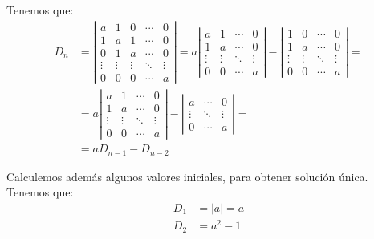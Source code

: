 \begin{ejercicio}
    Tenemos que:
    \begin{align*}
        D_n &= \left|
            \begin{array}{ccccc}
                a & 1 & 0 & \cdots & 0\\
                1 & a & 1 & \cdots & 0\\
                0 & 1 & a & \cdots & 0\\
                \vdots & \vdots & \vdots & \ddots & \vdots\\
                0 & 0 & 0 & \cdots & a
            \end{array}
        \right|
        = a\left|
            \begin{array}{cccc}
                a & 1 & \cdots & 0\\
                1 & a & \cdots & 0\\
                \vdots & \vdots & \ddots & \vdots\\
                0 & 0 & \cdots & a
            \end{array}
        \right|-\left|
            \begin{array}{cccc}
                1 & 0 & \cdots & 0\\
                1 & a & \cdots & 0\\
                \vdots & \vdots & \ddots & \vdots\\
                0 & 0 & \cdots & a
            \end{array}
        \right| =\\&
        = a\left|
            \begin{array}{cccc}
                a & 1 & \cdots & 0\\
                1 & a & \cdots & 0\\
                \vdots & \vdots & \ddots & \vdots\\
                0 & 0 & \cdots & a
            \end{array}
        \right|-\left|
            \begin{array}{ccc}
                a & \cdots & 0\\
                \vdots & \ddots & \vdots\\
                0 & \cdots & a
            \end{array}
        \right| =\\&
        = aD_{n-1} -D_{n-2}
    \end{align*}

    Calculemos además algunos valores iniciales, para obtener solución única. Tenemos que:
    \begin{align*}
        D_1 &= |a| = a\\
        D_2 &= a^2-1
    \end{align*}


\end{ejercicio}
